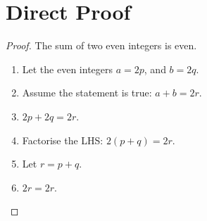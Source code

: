 \section{Direct Proof}
\begin{proof}
    The sum of two even integers is even.
    \begin{enumerate}
        \item Let the even integers \(a = 2p\), and \(b = 2q\).
        \item Assume the statement is true: \(a + b = 2r\).
        \item \(2p + 2q = 2r\).
        \item Factorise the LHS: \(2(p + q) = 2r\).
        \item Let \(r = p + q\).
        \item \(2r = 2r\).
    \end{enumerate}
\end{proof}

